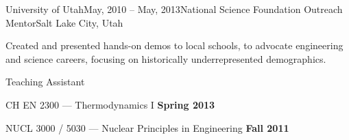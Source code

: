 \begin{rSubsection}{University of Utah}{May, 2010 -- May, 2013}{National Science Foundation Outreach Mentor}{Salt Lake City, Utah}
\item Created and presented hands-on demos to local schools, to advocate engineering and science careers, focusing on historically underrepresented demographics.
\end{rSubsection}\vspace{-1.5\baselineskip}
\begin{rSubsection}{}{}{Teaching Assistant}{}
\item CH EN 2300 ---  Thermodynamics I \hfill {\bf Spring 2013}
\item NUCL 3000 / 5030 ---  Nuclear Principles in Engineering \hfill {\bf Fall 2011}
% 






\end{rSubsection}
